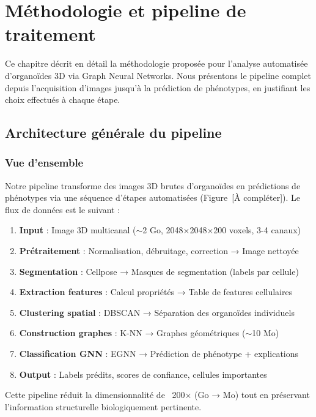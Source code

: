 
\chapter{Méthodologie et pipeline de traitement}

Ce chapitre décrit en détail la méthodologie proposée pour l'analyse automatisée d'organoïdes 3D via Graph Neural Networks. Nous présentons le pipeline complet depuis l'acquisition d'images jusqu'à la prédiction de phénotypes, en justifiant les choix effectués à chaque étape.

\section{Architecture générale du pipeline}

\subsection{Vue d'ensemble}

Notre pipeline transforme des images 3D brutes d'organoïdes en prédictions de phénotypes via une séquence d'étapes automatisées (Figure~[À compléter]). Le flux de données est le suivant :

\begin{enumerate}
    \item \textbf{Input} : Image 3D multicanal ($\sim$2 Go, 2048×2048×200 voxels, 3-4 canaux)
    \item \textbf{Prétraitement} : Normalisation, débruitage, correction → Image nettoyée
    \item \textbf{Segmentation} : Cellpose → Masques de segmentation (labels par cellule)
    \item \textbf{Extraction features} : Calcul propriétés → Table de features cellulaires
    \item \textbf{Clustering spatial} : DBSCAN → Séparation des organoïdes individuels
    \item \textbf{Construction graphes} : K-NN → Graphes géométriques ($\sim$10 Mo)
    \item \textbf{Classification GNN} : EGNN → Prédiction de phénotype + explications
    \item \textbf{Output} : Labels prédits, scores de confiance, cellules importantes
\end{enumerate}

Cette pipeline réduit la dimensionnalité de ~200× (Go → Mo) tout en préservant l'information structurelle biologiquement pertinente.

